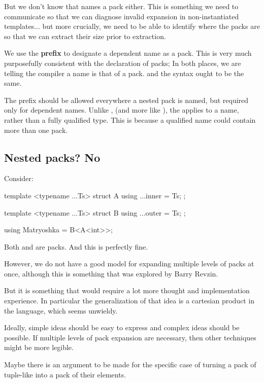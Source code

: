 \documentclass{wg21}
\begin{document}
But we don't know that  names a pack either.
This is something we need to communicate so that we can diagnose invalid expansion in non-instantiated templates...
but more crucially, we need to be able to identify where the packs are so that we can extract their size prior to extraction.

We use the  \textbf{prefix} to designate a dependent name as a pack.
This is very much purposefully consistent with the declaration of packs; In both places, we are telling the compiler a name is that of a pack.
and the syntax ought to be the same.

The  prefix should be allowed everywhere a nested pack is named, but required only for dependent names.
Unlike , (and more like ), the  applies to a name, rather than a fully qualified type.
This is because a qualified name could contain more than one pack.

\subsection{Nested packs? No}

Consider:

\begin{colorblock}
template <typename ...Ts>
struct A {
    using ...inner = Ts;
};

template <typename ...Ts>
struct B {
    using ...outer = Ts;
};

using Matryoshka = B<A<int>>;

\end{colorblock}

Both  and  are packs.
And this is perfectly fine.

However, we do not have a good model for expanding multiple levels of packs at once,
although this is something that was explored by Barry Revzin.

But it is something that would require a lot more thought and implementation experience.
In particular the generalization of that idea is a cartesian product in the language,
which seems unwieldy.

Ideally, simple ideas should be easy to express and complex ideas should be possible.
If multiple levels of pack expansion are necessary, then other techniques might be more legible.

Maybe there is an argument to be made for the specific case of turning a pack of tuple-like
into a pack of their elements.
\end{document}
